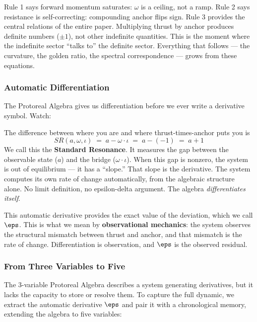 \begin{remark}
Rule 1 says forward momentum saturates: $\omega$ is a ceiling, not a ramp. Rule 2 says resistance is self-correcting: compounding anchor flips sign. Rule 3 provides the central relations of the entire paper. Multiplying thrust by anchor produces definite numbers ($\pm 1$), not other indefinite quantities. This is the moment where the indefinite sector ``talks to'' the definite sector. Everything that follows --- the curvature, the golden ratio, the spectral correspondence --- grows from these equations.
\end{remark}

\subsubsection*{Automatic Differentiation}

The Protoreal Algebra gives us differentiation before we ever write a derivative symbol. Watch:

The difference between where you are and where thrust-times-anchor puts you is
$$SR(a, \omega, \iota) \;=\; a - \omega \cdot \iota \;=\; a - (-1) \;=\; a + 1$$
We call this the \textbf{Standard Resonance}. It measures the gap between the observable state ($a$) and the bridge ($\omega \cdot \iota$). When this gap is nonzero, the system is out of equilibrium --- it has a ``slope.'' That slope is the derivative. The system computes its own rate of change automatically, from the algebraic structure alone. No limit definition, no epsilon-delta argument. The algebra \emph{differentiates itself}.

This automatic derivative provides the exact value of the deviation, which we call $\eps$. This is what we mean by \textbf{observational mechanics}: the system observes the structural mismatch between thrust and anchor, and that mismatch is the rate of change. Differentiation is observation, and $\eps$ is the observed residual.

\subsubsection*{From Three Variables to Five}

The 3-variable Protoreal Algebra describes a system generating derivatives, but it lacks the capacity to store or resolve them. To capture the full dynamic, we extract the automatic derivative $\eps$ and pair it with a chronological memory, extending the algebra to five variables:

